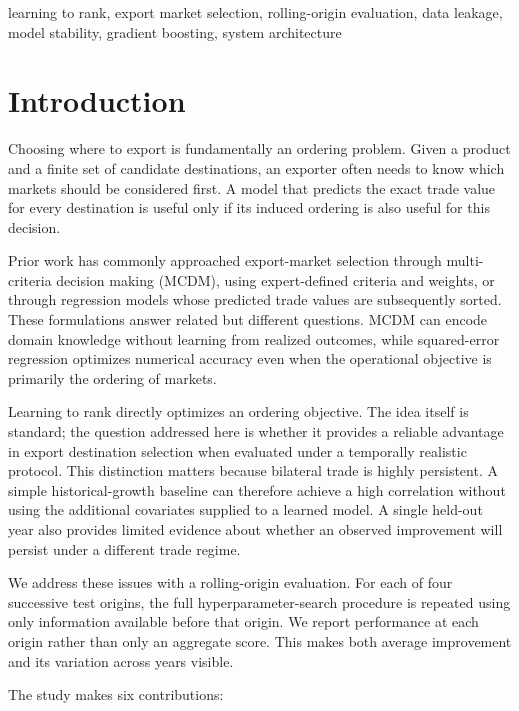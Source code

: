 \documentclass[conference]{IEEEtran}
\begin{document}
\begin{IEEEkeywords}
learning to rank, export market selection, rolling-origin evaluation, data leakage, model stability, gradient boosting, system architecture
\end{IEEEkeywords}

\section{Introduction}

Choosing where to export is fundamentally an ordering problem. Given a product and a finite set of candidate destinations, an exporter often needs to know which markets should be considered first. A model that predicts the exact trade value for every destination is useful only if its induced ordering is also useful for this decision.

Prior work has commonly approached export-market selection through multi-criteria decision making (MCDM), using expert-defined criteria and weights, or through regression models whose predicted trade values are subsequently sorted. These formulations answer related but different questions. MCDM can encode domain knowledge without learning from realized outcomes, while squared-error regression optimizes numerical accuracy even when the operational objective is primarily the ordering of markets.

Learning to rank directly optimizes an ordering objective. The idea itself is standard; the question addressed here is whether it provides a reliable advantage in export destination selection when evaluated under a temporally realistic protocol. This distinction matters because bilateral trade is highly persistent. A simple historical-growth baseline can therefore achieve a high correlation without using the additional covariates supplied to a learned model. A single held-out year also provides limited evidence about whether an observed improvement will persist under a different trade regime.

We address these issues with a rolling-origin evaluation. For each of four successive test origins, the full hyperparameter-search procedure is repeated using only information available before that origin. We report performance at each origin rather than only an aggregate score. This makes both average improvement and its variation across years visible.

The study makes six contributions:
\end{document}
